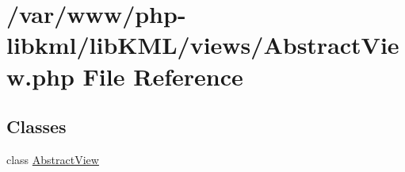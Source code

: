 \hypertarget{AbstractView_8php}{
\section{/var/www/php-\/libkml/libKML/views/AbstractView.php File Reference}
\label{d2/d81/AbstractView_8php}
}
\subsection*{Classes}
\begin{DoxyCompactItemize}
\item 
class \hyperlink{classAbstractView}{AbstractView}
\end{DoxyCompactItemize}
